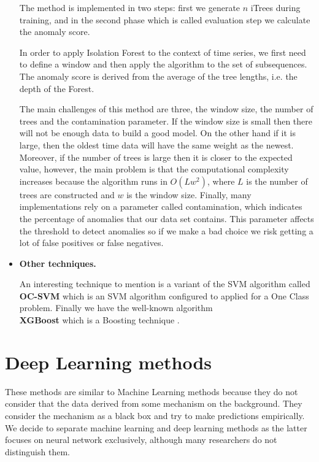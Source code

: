\documentclass[a4paper,12pt]{report}
\theoremstyle{definitionNODot}
\begin{document}
\begin{itemize}
		The method is implemented in two steps: first we generate $n$ iTrees during training, and in the second phase which is called evaluation step we calculate the anomaly score.
		
		In order to apply Isolation Forest to the context of time series, we first need to define a window and then apply the algorithm to the set of subsequences. The anomaly score is derived from the average of the tree lengths, i.e. the depth of the Forest. 
		
		The main challenges of this method are three, the window size, the number of trees and the contamination parameter. If the window size is small then there will not be enough data to build a good model. On the other hand if it is large, then the oldest time data will have the same weight as the newest. Moreover, if the number of trees is large then it is closer to the expected value, however, the main problem is that the computational complexity increases because the algorithm runs in $O(Lw^2)$, where $L$ is the number of trees are constructed and $w$ is the window size. Finally, many implementations rely on a parameter called contamination, which indicates the percentage of anomalies that our data set contains. This parameter affects the threshold to detect anomalies so if we make a bad choice we risk getting a lot of false positives or false negatives.
		
		\item \textbf{Other techniques.}
		
		An interesting technique to mention is a variant of the SVM algorithm called \textbf{OC-SVM} \cite{vapnik1964class, ocsvm1999anomalydetection} which is an SVM algorithm configured to applied for a One Class problem. Finally we have the well-known algorithm \\ \textbf{XGBoost} which is a Boosting technique \cite{Chen_2016}.
	\end{itemize}
	
	\section{Deep Learning methods}
	These methods are similar to Machine Learning methods because they do not consider that the data derived from some mechanism on the background. They consider the mechanism as a black box and try to make predictions empirically. We decide to separate machine learning and deep learning methods as the latter focuses on neural network exclusively, although many researchers do not distinguish them.
	
\end{document}
